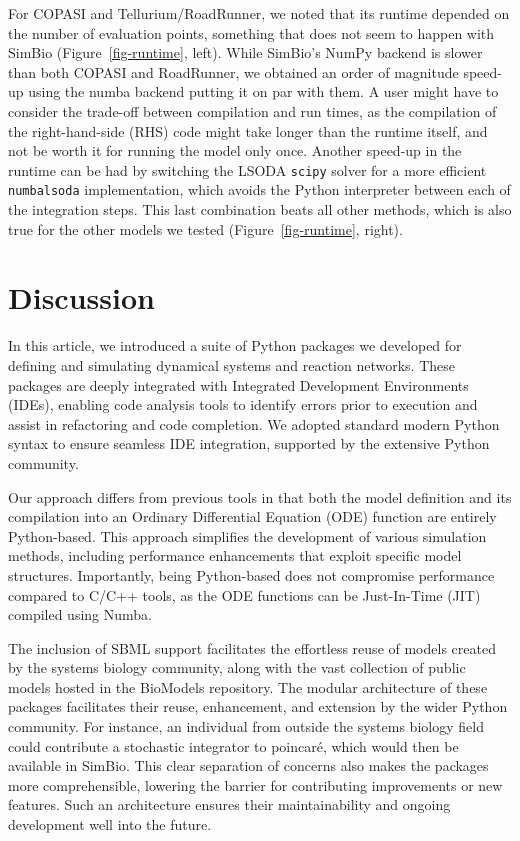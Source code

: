 \documentclass[
  a4paper,
  DIV=11,
  numbers=noendperiod]{scrartcl}
\begin{document}
For COPASI and Tellurium/RoadRunner, we noted that its runtime depended
on the number of evaluation points, something that does not seem to
happen with SimBio (Figure~\ref{fig-runtime}, left). While SimBio's
NumPy backend is slower than both COPASI and RoadRunner, we obtained an
order of magnitude speed-up using the numba backend putting it on par
with them. A user might have to consider the trade-off between
compilation and run times, as the compilation of the right-hand-side
(RHS) code might take longer than the runtime itself, and not be worth
it for running the model only once. Another speed-up in the runtime can
be had by switching the LSODA \texttt{scipy} solver for a more efficient
\texttt{numbalsoda} implementation, which avoids the Python interpreter
between each of the integration steps. This last combination beats all
other methods, which is also true for the other models we tested
(Figure~\ref{fig-runtime}, right).

\hypertarget{discussion}{%
\section{Discussion}\label{discussion}}

In this article, we introduced a suite of Python packages we developed
for defining and simulating dynamical systems and reaction networks.
These packages are deeply integrated with Integrated Development
Environments (IDEs), enabling code analysis tools to identify errors
prior to execution and assist in refactoring and code completion. We
adopted standard modern Python syntax to ensure seamless IDE
integration, supported by the extensive Python community.

Our approach differs from previous tools in that both the model
definition and its compilation into an Ordinary Differential Equation
(ODE) function are entirely Python-based. This approach simplifies the
development of various simulation methods, including performance
enhancements that exploit specific model structures. Importantly, being
Python-based does not compromise performance compared to C/C++ tools, as
the ODE functions can be Just-In-Time (JIT) compiled using Numba.

The inclusion of SBML support facilitates the effortless reuse of models
created by the systems biology community, along with the vast collection
of public models hosted in the BioModels repository. The modular
architecture of these packages facilitates their reuse, enhancement, and
extension by the wider Python community. For instance, an individual
from outside the systems biology field could contribute a stochastic
integrator to poincaré, which would then be available in SimBio. This
clear separation of concerns also makes the packages more
comprehensible, lowering the barrier for contributing improvements or
new features. Such an architecture ensures their maintainability and
ongoing development well into the future.
\end{document}
